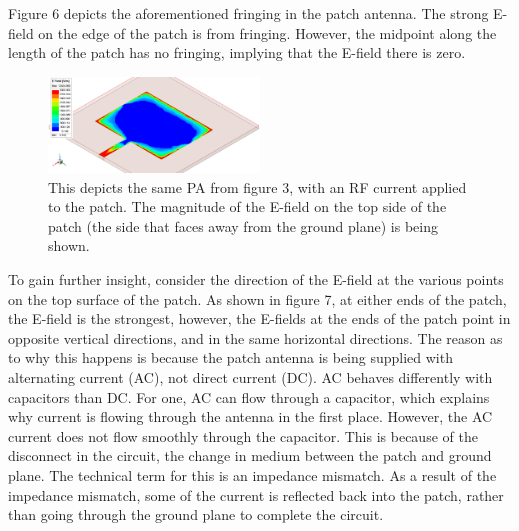 \documentclass[12pt]{article}
\begin{document}
Figure 6 depicts the aforementioned fringing in the patch antenna. The strong E-field on the edge of the patch is from fringing. However, the midpoint along the length of the patch has no fringing, implying that the E-field there is zero.

\begin{figure}[h]
    \centering
    \includegraphics[width=0.5\textwidth]{basic-patch-antenna-MagE-on-patch.png}
    \caption{This depicts the same PA from figure 3, with an RF current applied to the patch. The magnitude of the E-field on the top side of the patch (the side that faces away from the ground plane) is being shown.}
\end{figure}

To gain further insight, consider the direction of the E-field at the various points on the top surface of the patch. As shown in figure 7, at either ends of the patch, the E-field is the strongest, however, the E-fields at the ends of the patch point in opposite vertical directions, and in the same horizontal directions. The reason as to why this happens is because the patch antenna is being supplied with alternating current (AC), not direct current (DC). AC behaves differently with capacitors than DC. For one, AC can flow through a capacitor, which explains why current is flowing through the antenna in the first place. However, the AC current does not flow smoothly through the capacitor. This is because of the disconnect in the circuit, the change in medium between the patch and ground plane. The technical term for this is an impedance mismatch. As a result of the impedance mismatch, some of the current is reflected back into the patch, rather than going through the ground plane to complete the circuit. 
\end{document}
